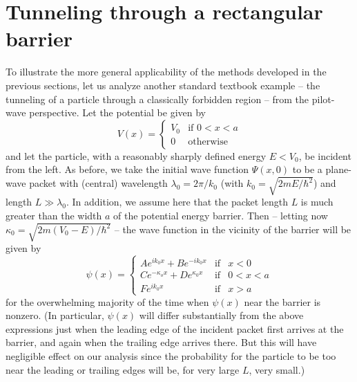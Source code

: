 \documentclass[aps,prc,twocolumn,letterpaper,floatfix]{revtex4}
\begin{document}
\section{Tunneling through a rectangular barrier}

To illustrate the more general applicability of the methods developed
in the previous sections, let us analyze another standard textbook
example -- the tunneling of a particle through a classically forbidden
region -- from the pilot-wave perspective.  Let the potential be given
by
\begin{equation}
V(x) = \left\{
\begin{array}{lc}
V_0 & \text{if }  0<x<a \\
0 & \text{otherwise}
\end{array} 
\right.
\end{equation}
and let the particle, with a reasonably sharply defined energy $E <
V_0$, be incident from the left.  As before, we take the initial wave
function $\Psi(x,0)$ to be a plane-wave packet with (central)
wavelength $\lambda_0 = 2 \pi / k_0$ (with $k_0 = \sqrt{2mE/\hbar^2}$)
and length $L \gg \lambda_0$.  In addition, we assume here that the
packet length $L$ is much greater than the width $a$ of the potential
energy barrier.  Then -- letting now $\kappa_0 = \sqrt{2m (V_0 - E) /
  \hbar^2}$ -- the wave function in the vicinity of the barrier
will be given by
\begin{equation}
\psi(x) = \left\{
\begin{array}{lcc}
A e^{ik_0x} + B e^{-i k_0 x} & \text{if} & x < 0 \\ 
C e^{-\kappa_o x} + D e^{\kappa_0 x} & \text{if} & 0 < x < a \\
F e^{i k_0 x} & \text{if} & x > a 
\end{array}
\right.
\end{equation}
for the overwhelming majority of the time when $\psi(x)$ near the
barrier is nonzero.  (In particular, $\psi(x)$ will differ
substantially from the above expressions just when the leading edge of
the incident packet first arrives at the barrier, and again when the
trailing edge arrives there.  But this will have negligible effect on
our analysis since the probability for the particle to be too near the
leading or trailing edges will be, for very large $L$, very small.)  
\end{document}

